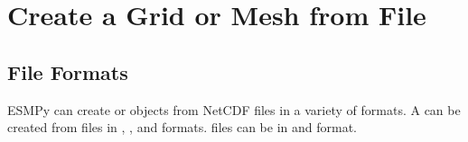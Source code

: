 \documentclass[letterpaper,10pt,english]{sphinxmanual}
\begin{document}
\begin{sphinxVerbatim}[commandchars=\\\{\}]
 
    \PYG{p}{[}\PYG{p}{]}  \PYG{p}{[}               \PYG{p}{]} 
\end{sphinxVerbatim}


\section{Create a Grid or Mesh from File}
\label{\detokenize{api:create-a-grid-or-mesh-from-file}}

\subsection{File Formats}
\label{\detokenize{api:file-formats}}
ESMPy can create {\hyperref[\detokenize{grid:ESMF.api.grid.Grid}]{}} or {\hyperref[\detokenize{mesh:ESMF.api.mesh.Mesh}]{}} objects from NetCDF files in a variety
of formats.  A {\hyperref[\detokenize{mesh:ESMF.api.mesh.Mesh}]{}} can be created from files in {\hyperref[\detokenize{FileFormat:ESMF.api.constants.FileFormat.SCRIP}]{}}, {\hyperref[\detokenize{FileFormat:ESMF.api.constants.FileFormat.ESMFMESH}]{}}, and {\hyperref[\detokenize{FileFormat:ESMF.api.constants.FileFormat.UGRID}]{}}
formats.  {\hyperref[\detokenize{grid:ESMF.api.grid.Grid}]{}} files can be in {\hyperref[\detokenize{FileFormat:ESMF.api.constants.FileFormat.SCRIP}]{}} and {\hyperref[\detokenize{FileFormat:ESMF.api.constants.FileFormat.GRIDSPEC}]{}} format.
\end{document}
